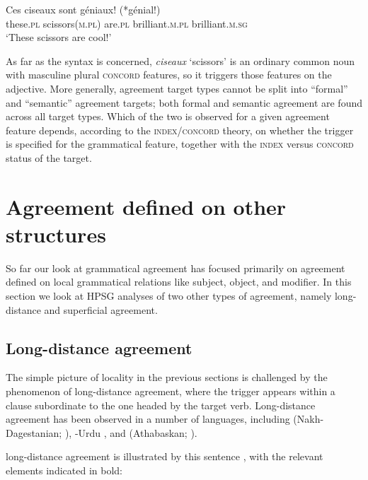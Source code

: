 \documentclass[output=paper
	        ,collection
	        ,collectionchapter
 	        ,biblatex
                ,babelshorthands
                ,newtxmath
                ,draftmode
                ,colorlinks, citecolor=brown
]{langscibook}
\begin{document}
\begin{exe} 
\ex\label{ciseaux}
\gll   Ces	ciseaux	sont	g\'{e}niaux!	(*g\'{e}nial!) \\
		these.\textsc{pl}	scissors(\textsc{m.pl})	are.\textsc{pl} 	brilliant.\textsc{m.pl}	brilliant.\textsc{m.sg} \\
\glt		`These scissors are cool!’ 
\end{exe}

\noindent
As far as the syntax is concerned, \textit{ciseaux} `scissors’ is an ordinary common noun with masculine plural \textsc{concord} features, so it triggers those features on the adjective.  More generally, agreement target types cannot be split into ``formal'' and ``semantic'' agreement targets; both formal and semantic agreement are found across all target types.  Which of the two is observed for a given agreement feature depends, according to the  \textsc{index/concord}  theory,  on whether the trigger is specified for the grammatical feature, together with the  \textsc{index}  versus  \textsc{concord}  status of the target.  
 

\section{Agreement defined on other structures}
So far our look at grammatical agreement has focused primarily on agreement defined on local grammatical relations like subject, object, and modifier.  In this section we look at HPSG analyses of two other types of agreement, namely long-distance and superficial agreement.  

\subsection{Long-distance agreement}
\label{LDA}

The simple picture of locality in the previous sections is challenged by the phenomenon of long-distance agreement, where the trigger appears within a clause subordinate to the one headed by the target verb.  Long-distance agreement has been observed in a number of languages, including  (Nakh-Dagestanian; \citealt{polinsky+potsdam:2001}), -Urdu \citep{bhatt:2005}, and  (Athabaskan; \citealt{bruening:2001,LeSourd:2018}).  

 long-distance agreement is illustrated by this sentence \citep[example\,(5)]{LeSourd:2018}, with the relevant elements indicated in bold:
\end{document}
